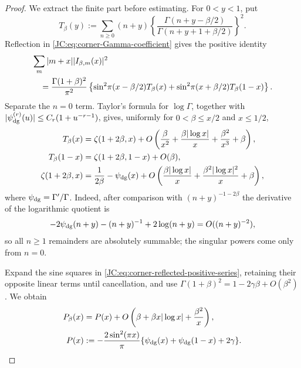 \begin{proof}
We extract the finite part before estimating.  For $0<y<1$, put
\[
 T_\beta(y):=\sum_{n\ge0}(n+y)
 \left\{\frac{\Gamma(n+y-\beta/2)}
 {\Gamma(n+y+1+\beta/2)}\right\}^2.
\]
Reflection in \eqref{JC:eq:corner-Gamma-coefficient} gives the positive
identity
\begin{align}
 &\sum_m|m+x||I_{\beta,m}(x)|^2\notag\\
 &\quad=
 \frac{\Gamma(1+\beta)^2}{\pi^2}
 \left\{\sin^2\!\pi(x-\beta/2)T_\beta(x)
 +\sin^2\!\pi(x+\beta/2)T_\beta(1-x)\right\}.
 \label{JC:eq:corner-reflected-positive-series}
\end{align}
Separate the $n=0$ term.  Taylor's formula for $\log\Gamma$, together
with $|\psi_{\rm dg}^{(r)}(u)|\le C_r(1+u^{-r-1})$, gives, uniformly
for $0<\beta\le x/2$ and $x\le1/2$,
\begin{align*}
 T_\beta(x)
 &=\zeta(1+2\beta,x)
 +O\left(\frac\beta{x^2}
 +\frac{\beta|\log x|}{x}
 +\frac{\beta^2}{x^3}+\beta\right),\\
 T_\beta(1-x)&=\zeta(1+2\beta,1-x)+O(\beta),\\
 \zeta(1+2\beta,x)
 &=\frac1{2\beta}-\psi_{\rm dg}(x)
 +O\left(\frac{\beta|\log x|}{x}
 +\frac{\beta^2|\log x|^2}{x}+\beta\right),
\end{align*}
where $\psi_{\rm dg}=\Gamma'/\Gamma$.  Indeed, after comparison with
$(n+y)^{-1-2\beta}$ the derivative of the logarithmic quotient is
\[
 -2\psi_{\rm dg}(n+y)-(n+y)^{-1}+2\log(n+y)
 =O((n+y)^{-2}),
\]
so all $n\ge1$ remainders are absolutely summable; the singular powers
come only from $n=0$.

Expand the sine squares in
\eqref{JC:eq:corner-reflected-positive-series}, retaining their opposite
linear terms until cancellation, and use
$\Gamma(1+\beta)^2=1-2\gamma\beta+O(\beta^2)$.  We obtain
\begin{align}
 P_\beta(x)&=P(x)+
 O\left(\beta+\beta x|\log x|+\frac{\beta^2}{x}\right),
 \label{JC:eq:corner-mesoscopic-remainder}\\
 P(x)&:=-\frac{2\sin^2(\pi x)}{\pi}
 \{\psi_{\rm dg}(x)+\psi_{\rm dg}(1-x)+2\gamma\}.
 \label{JC:eq:corner-renormalized-symbol}
\end{align}


\end{proof}

